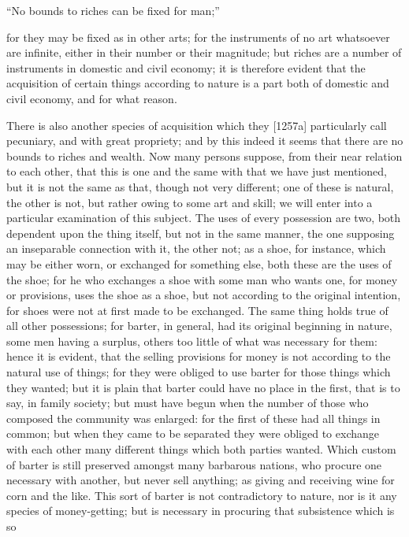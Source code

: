 ``No bounds to riches can be fixed for man;''

for they may be fixed as in other arts; for the instruments of no art
whatsoever are infinite, either in their number or their magnitude; but
riches are a number of instruments in domestic and civil economy; it is
therefore evident that the acquisition of certain things according to
nature is a part both of domestic and civil economy, and for what reason.


There is also another species of acquisition which they [1257a]
particularly call pecuniary, and with great propriety; and by this indeed
it seems that there are no bounds to riches and wealth. Now many persons
suppose, from their near relation to each other, that this is one and the
same with that we have just mentioned, but it is not the same as that,
though not very different; one of these is natural, the other is not, but
rather owing to some art and skill; we will enter into a particular
examination of this subject. The uses of every possession are two, both
dependent upon the thing itself, but not in the same manner, the one
supposing an inseparable connection with it, the other not; as a shoe, for
instance, which may be either worn, or exchanged for something else, both
these are the uses of the shoe; for he who exchanges a shoe with some man
who wants one, for money or provisions, uses the shoe as a shoe, but not
according to the original intention, for shoes were not at first made to
be exchanged. The same thing holds true of all other possessions; for
barter, in general, had its original beginning in nature, some men having
a surplus, others too little of what was necessary for them: hence it is
evident, that the selling provisions for money is not according to the
natural use of things; for they were obliged to use barter for those
things which they wanted; but it is plain that barter could have no place
in the first, that is to say, in family society; but must have begun when
the number of those who composed the community was enlarged: for the first
of these had all things in common; but when they came to be separated they
were obliged to exchange with each other many different things which both
parties wanted. Which custom of barter is still preserved amongst many
barbarous nations, who procure one necessary with another, but never sell
anything; as giving and receiving wine for corn and the like. This sort of
barter is not contradictory to nature, nor is it any species of
money-getting; but is necessary in procuring that subsistence which is so
